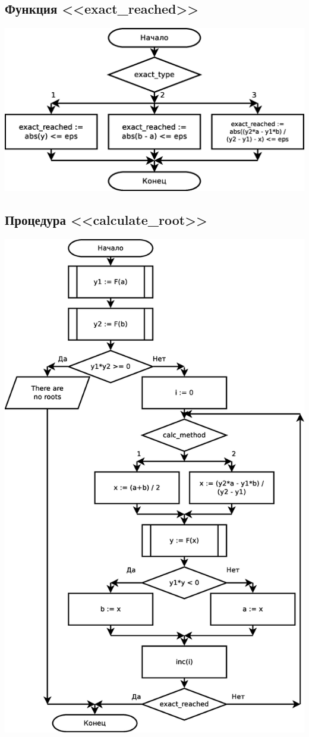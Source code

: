 \documentclass[a4paper]{article}
\begin{document}
\subsection{Функция <<exact\_reached>>}
\includegraphics[scale=0.5]{schemes/exact_reached}

\subsection{Процедура <<calculate\_root>>}
\includegraphics[scale=0.5]{schemes/calculate_root}
\end{document}
